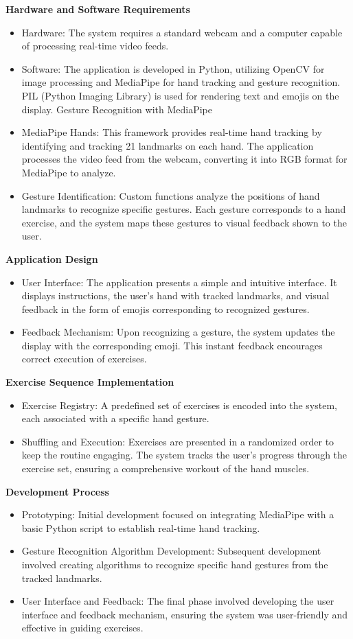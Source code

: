 \documentclass[12pt, letterpaper, twoside]{article}
\begin{document}
    \textbf{Hardware and Software Requirements}
    \begin{itemize}
        \item Hardware: The system requires a standard webcam and a computer capable of processing real-time video feeds.
        \item Software: The application is developed in Python, utilizing OpenCV for image processing and MediaPipe for hand tracking and gesture recognition. PIL (Python Imaging Library) is used for rendering text and emojis on the display.
    Gesture Recognition with MediaPipe
        \item MediaPipe Hands: This framework provides real-time hand tracking by identifying and tracking 21 landmarks on each hand. The application processes the video feed from the webcam, converting it into RGB format for MediaPipe to analyze.
        \item Gesture Identification: Custom functions analyze the positions of hand landmarks to recognize specific gestures. Each gesture corresponds to a hand exercise, and the system maps these gestures to visual feedback shown to the user.
    \end{itemize}
    \textbf{Application Design}
    \begin{itemize}
        \item User Interface: The application presents a simple and intuitive interface. It displays instructions, the user's hand with tracked landmarks, and visual feedback in the form of emojis corresponding to recognized gestures.
        \item Feedback Mechanism: Upon recognizing a gesture, the system updates the display with the corresponding emoji. This instant feedback encourages correct execution of exercises.
    \end{itemize}
    \textbf{Exercise Sequence Implementation}
    \begin{itemize}
        \item Exercise Registry: A predefined set of exercises is encoded into the system, each associated with a specific hand gesture.
        \item Shuffling and Execution: Exercises are presented in a randomized order to keep the routine engaging. The system tracks the user's progress through the exercise set, ensuring a comprehensive workout of the hand muscles.
    \end{itemize}
    \textbf{Development Process}
    \begin{itemize}
        \item Prototyping: Initial development focused on integrating MediaPipe with a basic Python script to establish real-time hand tracking.
        \item  Gesture Recognition Algorithm Development: Subsequent development involved creating algorithms to recognize specific hand gestures from the tracked landmarks.
        \item User Interface and Feedback: The final phase involved developing the user interface and feedback mechanism, ensuring the system was user-friendly and effective in guiding exercises.
    \end{itemize}
\end{document}
